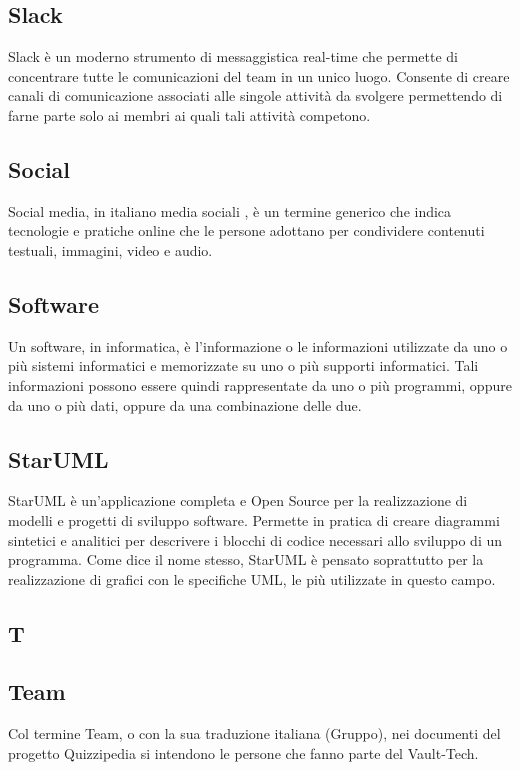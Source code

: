 \subsection*{Slack}
Slack è un moderno strumento di messaggistica real-time che permette di concentrare tutte le comunicazioni del team in un unico luogo.
Consente di creare canali di comunicazione associati alle singole attività da svolgere permettendo di farne parte solo ai membri ai quali tali attività competono.

\subsection*{Social}
Social media, in italiano media sociali , è un termine generico che indica tecnologie e pratiche online che le persone adottano per condividere contenuti testuali, immagini, video e audio.

\subsection*{Software}
Un software, in informatica, è l'informazione o le informazioni utilizzate da uno o più
sistemi informatici e memorizzate su uno o più supporti informatici. Tali informazioni possono
essere quindi rappresentate da uno o più programmi, oppure da uno o più dati, oppure
da una combinazione delle due.

\subsection*{StarUML}
StarUML è un'applicazione completa e Open Source per la realizzazione di modelli e progetti di sviluppo software. Permette in pratica di creare diagrammi sintetici e analitici per descrivere i blocchi di codice necessari allo sviluppo di un programma. Come dice il nome stesso, StarUML è pensato soprattutto per la realizzazione di grafici con le specifiche UML, le più utilizzate in questo campo.

\newpage

\begin{center}
\Huge\section*{\uppercase{T}}
\end{center}

\subsection*{Team}
Col termine Team, o con la sua traduzione italiana (Gruppo), nei documenti del progetto
Quizzipedia si intendono le persone che fanno parte del Vault-Tech.


